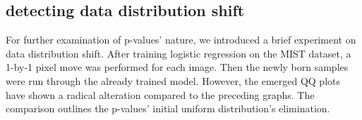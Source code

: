 \documentclass{article}
\begin{document}
\subsection{detecting data distribution shift}

For further examination of p-values’ nature, we introduced a brief experiment on data distribution shift. After training logistic regression on the MIST dataset, a 1-by-1 pixel move was performed for each image. Then the newly born samples were run through the already trained model. However, the emerged QQ plots have shown a radical alteration compared to the preceding graphs. The comparison outlines the p-values’ initial uniform distribution’s elimination. 

%
%	
%
%
%
%
%
\end{document}
